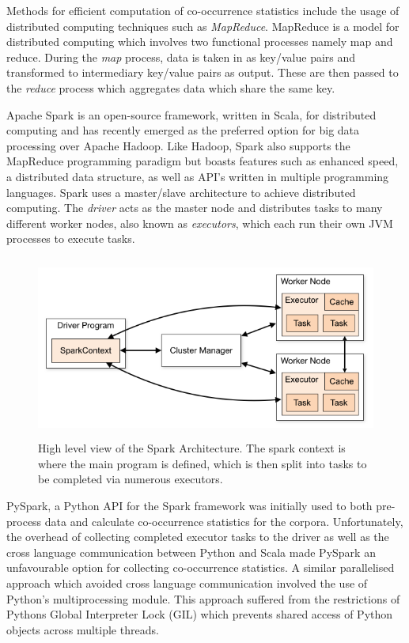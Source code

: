 \noindent
\newline
Methods for efficient computation of co-occurrence statistics include the usage of distributed computing techniques such as \textit{MapReduce}. MapReduce is a model for distributed computing which involves two functional processes namely map and reduce. During the \textit{map} process, data is taken in as key/value pairs and transformed to intermediary key/value pairs as output. These are then passed to the \textit{reduce} process which aggregates data which share the same key.

\noindent
\newline
Apache Spark is an open-source framework, written in Scala, for distributed computing and has recently emerged as the preferred option for big data processing over Apache Hadoop. Like Hadoop, Spark also supports the MapReduce programming paradigm but boasts features such as enhanced speed, a distributed data structure, as well as API's written in multiple programming languages. Spark uses a master/slave architecture to achieve distributed computing. The \textit{driver} acts as the master node and distributes tasks to many different worker nodes, also known as \textit{executors}, which each run their own JVM processes to execute tasks.

\begin{figure}[h]
	\includegraphics[width=12cm, height=6cm]{./figures/fig5}
	\centering
	\caption{High level view of the Spark Architecture. The spark context is where the main program is defined, which is then split into tasks to be completed via numerous executors.}
	\label{fig:fig5}
\end{figure}

\noindent
\newline
PySpark, a Python API for the Spark framework was initially used to both pre-process data and calculate co-occurrence statistics for the corpora. 
Unfortunately, the overhead of collecting completed executor tasks to the driver as well as the  cross language communication between Python and Scala made PySpark an unfavourable option for collecting co-occurrence statistics. A similar parallelised approach which avoided cross language communication involved the use of Python's multiprocessing module. This  approach suffered from the restrictions of Pythons Global Interpreter Lock (GIL) which prevents shared access of Python objects across multiple threads. 

